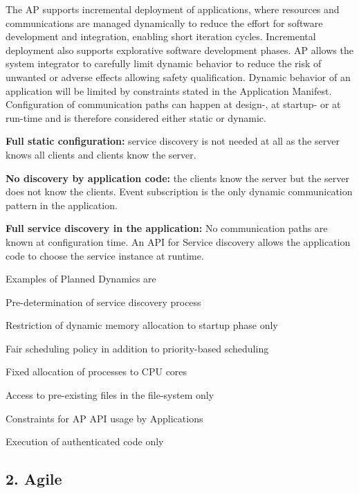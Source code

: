 The AP supports incremental deployment of applications, where resources and communications are managed dynamically to reduce the effort for software development and integration, enabling short iteration cycles. Incremental deployment also supports explorative software development phases. AP allows the system integrator to carefully limit dynamic behavior to reduce the risk of unwanted or adverse effects allowing safety qualification. Dynamic behavior of an application will be limited by constraints stated in the Application Manifest.  Configuration of communication paths can happen at design-\/, at startup-\/ or at run-\/time and is therefore considered either static or dynamic.
\begin{DoxyItemize}
\item {\bfseries Full static configuration\+:} service discovery is not needed at all as the server knows all clients and clients know the server.
\item {\bfseries No discovery by application code\+:} the clients know the server but the server does not know the clients. Event subscription is the only dynamic communication pattern in the application.
\item {\bfseries Full service discovery in the application\+:} No communication paths are known at configuration time. An A\+PI for Service discovery allows the application code to choose the service instance at runtime.
\end{DoxyItemize}

Examples of Planned Dynamics are
\begin{DoxyItemize}
\item Pre-\/determination of service discovery process
\item Restriction of dynamic memory allocation to startup phase only
\item Fair scheduling policy in addition to priority-\/based scheduling
\item Fixed allocation of processes to C\+PU cores
\item Access to pre-\/existing files in the file-\/system only
\item Constraints for AP A\+PI usage by Applications
\item Execution of authenticated code only
\end{DoxyItemize}

\subsection*{2. Agile}

